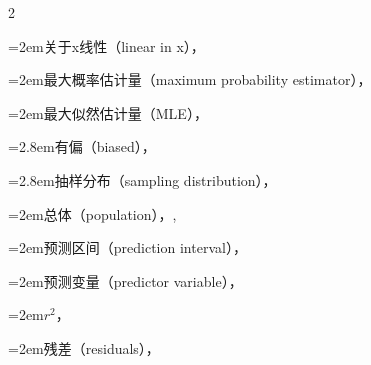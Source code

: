 \begin{multicols}{2}
\par\noindent\hangindent=2em\hspace*{1em}\label{idx:896}关于x线性（linear in x），\hyperref[idxocc:896:467]{\pageref*{idxocc:896:467}}\par
\par\noindent\hangindent=2em\hspace*{1em}\label{idx:897}最大概率估计量（maximum probability estimator），\hyperref[item:11.37.e]{\pageref*{item:11.37.e}}\par
\par\noindent\hangindent=2em\hspace*{1em}\label{idx:898}最大似然估计量（MLE），\hyperref[sec:11.3.4]{\pageref*{sec:11.3.4}}\par
\par\noindent\hangindent=2.8em\hspace*{1.8em}\label{idx:899}有偏（biased），\hyperref[idxocc:899:477]{\pageref*{idxocc:899:477}}\par
\par\noindent\hangindent=2.8em\hspace*{1.8em}\label{idx:900}抽样分布（sampling distribution），\hyperref[thm:11.3.3]{\pageref*{thm:11.3.3}}\par
\par\noindent\hangindent=2em\hspace*{1em}\label{idx:901}总体（population），\hyperref[idxocc:901:452]{\pageref*{idxocc:901:452}}, \hyperref[eq:11.3.2]{\pageref*{eq:11.3.2}}\par
\par\noindent\hangindent=2em\hspace*{1em}\label{idx:902}预测区间（prediction interval），\hyperref[eq:11.3.41]{\pageref*{eq:11.3.41}}\par
\par\noindent\hangindent=2em\hspace*{1em}\label{idx:903}预测变量（predictor variable），\hyperref[idxocc:903:467]{\pageref*{idxocc:903:467}}\par
\par\noindent\hangindent=2em\hspace*{1em}\label{idx:904}$r^2$，\hyperref[idxocc:904:481]{\pageref*{idxocc:904:481}}\par
\par\noindent\hangindent=2em\hspace*{1em}\label{idx:905}残差（residuals），\hyperref[eq:11.3.27]{\pageref*{eq:11.3.27}}\par

\end{multicols}
